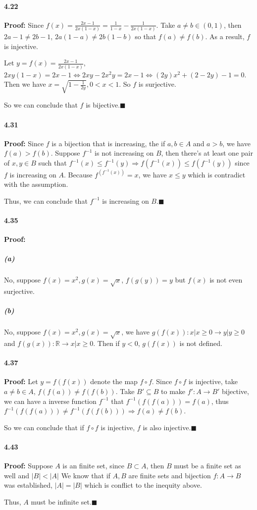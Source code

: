 \documentclass[11pt]{article}
\begin{document}
	\paragraph{4.22}\textbf{Proof:}
		Since $f(x) = \frac{2x - 1}{2x(1 - x)} = \frac{1}{1 - x} - \frac{1}{2x(1-x)}$.
		Take $a \neq b \in (0, 1)$, then $2a - 1 \neq 2b - 1$, $2a(1 - a) \neq 2b(1 - b)$ so that $f(a) \neq f(b)$. As a result, $f$ is injective.
		
		Let $y = f(x) = \frac{2x - 1}{2x(1 - x)}$, $2xy(1 - x) = 2x - 1 \Leftrightarrow 2xy - 2x^2y = 2x -1 \Leftrightarrow (2y)x^2 + (2 - 2y) - 1 = 0$. Then we have $x = \sqrt{1 - \frac{1}{2y}}, 0 < x < 1$. So $f$ is surjective.
		
		So we can conclude that $f$ is bijective.$\blacksquare$  
	\paragraph{4.31}\textbf{Proof:} Since $f$ is a bijection that is increasing, the if $a, b \in A$ and $a > b$, we have $f(a) > f(b)$. Suppose $f^{-1}$ is not increasing on $B$, then there's at least one pair of $x, y \in B$ such that $f^{-1}(x) \leq f^{-1}(y) \Rightarrow f(f^{-1}(x)) \leq f(f^{-1}(y))$ since $f$ is increasing on $A$. Because $f^(f^{-1}(x)) = x$, we have $x \leq y$ which is contradict with the assumption. 
	
	Thus, we can conclude that $f^{-1}$ is increasing on $B$.$\blacksquare$
	\paragraph{4.35}\textbf{Proof:}
		\subparagraph{(a)}
			No, suppose $f(x) = x^2, g(x) = \sqrt{x}$, $f(g(y)) = y$ but $f(x)$ is not even surjective.
		\subparagraph{(b)}
			No, suppose $f(x) = x^2, g(x) = \sqrt{x}$, we have $g(f(x)): {x | x \geq 0} \rightarrow {y | y \geq 0}$ and $f(g(x)): \mathbb{R} \rightarrow {x | x \geq 0}$. Then if $y < 0$, $g(f(x))$ is not defined.
	\paragraph{4.37}\textbf{Proof:}
		Let $y = f(f(x))$ denote the map $f \circ f$. Since $f \circ f$ is injective, take $a \neq b \in A$, $f(f(a)) \neq f(f(b))$. Take $B' \subseteq B$ to make $f': A \rightarrow B'$ bijective, we can have a inverse function $f^{-1}$ that $f^{-1}(f(f(a))) = f(a)$, thus $f^{-1}(f(f(a))) \neq f^{-1}(f(f(b))) \Rightarrow f(a) \neq f(b)$.
		
		So we can conclude that if $f \circ f$ is injective, $f$ is also injective.$\blacksquare$
	\paragraph{4.43}\textbf{Proof:} Suppose $A$ is an finite set, since $B \subset A$, then $B$ must be a finite set as well and $|B| < |A|$ We know that if $A, B$ are finite sets and bijection $f : A \rightarrow B$ was established, $|A| = |B|$ which is conflict to the inequity above.
	
	Thus, $A$ must be infinite set.$\blacksquare$
\end{document}
